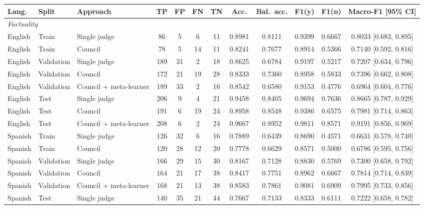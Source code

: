 \begin{tabular}{lllccccccccc}
\hline
\textbf{Lang.} & \textbf{Split} & \textbf{Approach} & \textbf{TP} & \textbf{FP} & \textbf{FN} & \textbf{TN} & \textbf{Acc.} & \textbf{Bal.\ acc.} & \textbf{F1(y)} & \textbf{F1(n)} & \textbf{Macro-F1 [95\% CI]} \\
\hline
\multicolumn{12}{l}{\textit{Factuality}} \\
\hline
English & Train & Single judge & 86 & 5 & 6 & 11 & 0.8981 & 0.8111 & 0.9399 & 0.6667 & 0.8033 [0.683, 0.895] \\
English & Train & Council & 78 & 5 & 14 & 11 & 0.8241 & 0.7677 & 0.8914 & 0.5366 & 0.7140 [0.592, 0.816] \\
English & Validation & Single judge & 189 & 31 & 2 & 18 & 0.8625 & 0.6784 & 0.9197 & 0.5217 & 0.7207 [0.634, 0.796] \\
English & Validation & Council & 172 & 21 & 19 & 28 & 0.8333 & 0.7360 & 0.8958 & 0.5833 & 0.7396 [0.662, 0.808] \\
English & Validation & Council + meta-learner & 189 & 33 & 2 & 16 & 0.8542 & 0.6580 & 0.9153 & 0.4776 & 0.6964 [0.604, 0.776] \\
English & Test & Single judge & 206 & 9 & 4 & 21 & 0.9458 & 0.8405 & 0.9694 & 0.7636 & 0.8665 [0.787, 0.929] \\
English & Test & Council & 191 & 6 & 19 & 24 & 0.8958 & 0.8548 & 0.9386 & 0.6575 & 0.7981 [0.714, 0.863] \\
English & Test & Council + meta-learner & 208 & 6 & 2 & 24 & 0.9667 & 0.8952 & 0.9811 & 0.8571 & 0.9191 [0.856, 0.969] \\
Spanish & Train & Single judge & 126 & 32 & 6 & 16 & 0.7889 & 0.6439 & 0.8690 & 0.4571 & 0.6631 [0.578, 0.740] \\
Spanish & Train & Council & 120 & 28 & 12 & 20 & 0.7778 & 0.6629 & 0.8571 & 0.5000 & 0.6786 [0.595, 0.756] \\
Spanish & Validation & Single judge & 166 & 29 & 15 & 30 & 0.8167 & 0.7128 & 0.8830 & 0.5769 & 0.7300 [0.658, 0.792] \\
Spanish & Validation & Council & 164 & 21 & 17 & 38 & 0.8417 & 0.7751 & 0.8962 & 0.6667 & 0.7814 [0.714, 0.839] \\
Spanish & Validation & Council + meta-learner & 168 & 21 & 13 & 38 & 0.8583 & 0.7861 & 0.9081 & 0.6909 & 0.7995 [0.733, 0.856] \\
Spanish & Test & Single judge & 140 & 35 & 21 & 44 & 0.7667 & 0.7133 & 0.8333 & 0.6111 & 0.7222 [0.658, 0.782] \\

\end{tabular}

